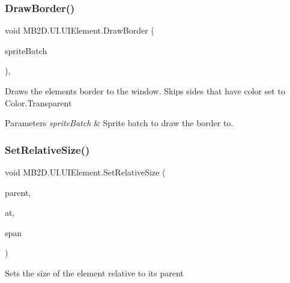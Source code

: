 \subsubsection{\texorpdfstring{Draw\+Border()}{DrawBorder()}}
{\footnotesize\ttfamily void M\+B2\+D.\+U\+I.\+U\+I\+Element.\+Draw\+Border (\begin{DoxyParamCaption}\item[{Sprite\+Batch}]{sprite\+Batch }\end{DoxyParamCaption})\hspace{0.3cm}{\ttfamily [inline]}, {\ttfamily [protected]}}



Draws the elements border to the window. Skips sides that have color set to Color.\+Transparent 


\begin{DoxyParams}{Parameters}
{\em sprite\+Batch} & Sprite batch to draw the border to.\\
\hline
\end{DoxyParams}
\hypertarget{class_m_b2_d_1_1_u_i_1_1_u_i_element_a4c3d52b5993c5f1d6615d0535fdd9e19}{}\label{class_m_b2_d_1_1_u_i_1_1_u_i_element_a4c3d52b5993c5f1d6615d0535fdd9e19} 
\subsubsection{\texorpdfstring{Set\+Relative\+Size()}{SetRelativeSize()}\hspace{0.1cm}{\footnotesize\ttfamily [1/2]}}
{\footnotesize\ttfamily void M\+B2\+D.\+U\+I.\+U\+I\+Element.\+Set\+Relative\+Size (\begin{DoxyParamCaption}\item[{\hyperlink{class_m_b2_d_1_1_u_i_1_1_u_i_content}{U\+I\+Content}}]{parent,  }\item[{Point}]{at,  }\item[{Point}]{span }\end{DoxyParamCaption})\hspace{0.3cm}{\ttfamily [inline]}}



Sets the size of the element relative to its parent 


